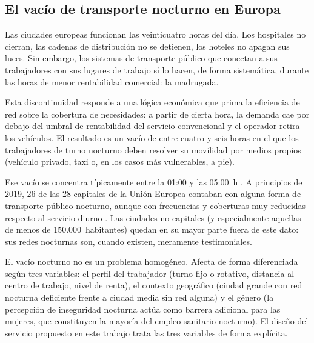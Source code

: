 


\subsection{El vacío de transporte nocturno en Europa}
\label{sec:vacio-nocturno}

Las ciudades europeas funcionan las veinticuatro horas del día. Los
hospitales no cierran, las cadenas de distribución no se detienen, los
hoteles no apagan sus luces. Sin embargo, los sistemas de transporte
público que conectan a sus trabajadores con sus lugares de trabajo sí lo
hacen, de forma sistemática, durante las horas de menor rentabilidad
comercial: la madrugada.

Esta discontinuidad responde a una lógica
económica que prima la eficiencia de red sobre la cobertura de necesidades:
a partir de cierta hora, la demanda cae por debajo del umbral de rentabilidad
del servicio convencional y el operador retira los vehículos. El resultado
es un vacío de entre cuatro y seis horas en el que los trabajadores de turno
nocturno deben resolver su movilidad por medios propios (vehículo
privado, taxi o, en los casos más vulnerables, a pie).

\begin{claimS}
Ese vacío se concentra típicamente entre la 01:00 y las 05:00~h
\parencite{PlyushetvaBoussauw2020}. A principios de 2019, 26 de las 28 capitales de
la Unión Europea contaban con alguna forma de transporte público nocturno,
aunque con frecuencias y coberturas muy reducidas respecto al servicio diurno
\parencite{PlyushetvaBoussauw2020}. Las ciudades no capitales (y especialmente
aquellas de menos de 150.000~habitantes) quedan en su mayor parte fuera
de este dato: sus redes nocturnas son, cuando existen, meramente testimoniales.
\end{claimS}

El vacío nocturno no es un problema homogéneo. Afecta de forma diferenciada
según tres variables: el perfil del trabajador (turno fijo o rotativo,
distancia al centro de trabajo, nivel de renta), el contexto geográfico
(ciudad grande con red nocturna deficiente frente a ciudad media sin red
alguna) y el género (la percepción de inseguridad nocturna actúa como
barrera adicional para las mujeres, que constituyen la mayoría del empleo
sanitario nocturno). El diseño del servicio propuesto en este trabajo trata
las tres variables de forma explícita.



